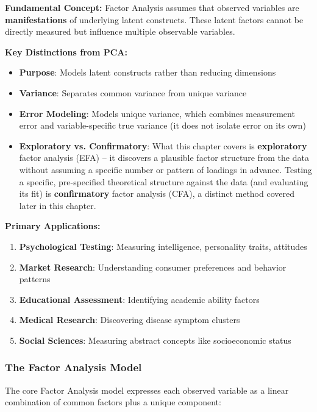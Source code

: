 \documentclass[
]{article}
\begin{document}
\textbf{Fundamental Concept:} Factor Analysis assumes that observed
variables are \textbf{manifestations} of underlying latent constructs.
These latent factors cannot be directly measured but influence multiple
observable variables.

\textbf{Key Distinctions from PCA:}

\begin{itemize}
\item
  \textbf{Purpose}: Models latent constructs rather than reducing
  dimensions
\item
  \textbf{Variance}: Separates common variance from unique variance
\item
  \textbf{Error Modeling}: Models unique variance, which combines
  measurement error and variable-specific true variance (it does not
  isolate error on its own)
\item
  \textbf{Exploratory vs. Confirmatory}: What this chapter covers is
  \textbf{exploratory} factor analysis (EFA) -- it discovers a plausible
  factor structure from the data without assuming a specific number or
  pattern of loadings in advance. Testing a specific, pre-specified
  theoretical structure against the data (and evaluating its fit) is
  \textbf{confirmatory} factor analysis (CFA), a distinct method covered
  later in this chapter.
\end{itemize}

\textbf{Primary Applications:}

\begin{enumerate}
\item
  \textbf{Psychological Testing}: Measuring intelligence, personality
  traits, attitudes
\item
  \textbf{Market Research}: Understanding consumer preferences and
  behavior patterns
\item
  \textbf{Educational Assessment}: Identifying academic ability factors
\item
  \textbf{Medical Research}: Discovering disease symptom clusters
\item
  \textbf{Social Sciences}: Measuring abstract concepts like
  socioeconomic status
\end{enumerate}

\subsubsection{The Factor Analysis Model}

The core Factor Analysis model expresses each observed variable as a
linear combination of common factors plus a unique component:
\end{document}
